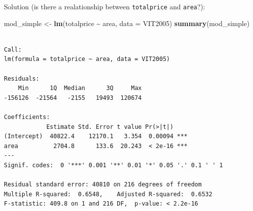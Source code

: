 \documentclass[
  ignorenonframetext,
]{beamer}
\newenvironment{Shaded}{\begin{snugshade}}{\end{snugshade}}
\newcommand{\AttributeTok}[1]{\textcolor[rgb]{0.13,0.29,0.53}{#1}}
\newcommand{\FunctionTok}[1]{\textcolor[rgb]{0.13,0.29,0.53}{\textbf{#1}}}
\newcommand{\NormalTok}[1]{#1}
\newcommand{\OtherTok}[1]{\textcolor[rgb]{0.56,0.35,0.01}{#1}}
\newcommand{\SpecialCharTok}[1]{\textcolor[rgb]{0.81,0.36,0.00}{\textbf{#1}}}
\begin{document}
\begin{frame}[fragile]{Solution (is there a realationship between
\texttt{totalprice} and \texttt{area}?):}
\protect\hypertarget{solution-is-there-a-realationship-between-totalprice-and-area-1}{}
\scriptsize

\begin{Shaded}
\begin{Highlighting}[]
\NormalTok{mod\_simple }\OtherTok{\textless{}{-}} \FunctionTok{lm}\NormalTok{(totalprice }\SpecialCharTok{\textasciitilde{}}\NormalTok{ area, }\AttributeTok{data =}\NormalTok{ VIT2005)}
\FunctionTok{summary}\NormalTok{(mod\_simple)}
\end{Highlighting}
\end{Shaded}

\begin{verbatim}

Call:
lm(formula = totalprice ~ area, data = VIT2005)

Residuals:
    Min      1Q  Median      3Q     Max 
-156126  -21564   -2155   19493  120674 

Coefficients:
            Estimate Std. Error t value Pr(>|t|)    
(Intercept)  40822.4    12170.1   3.354  0.00094 ***
area          2704.8      133.6  20.243  < 2e-16 ***
---
Signif. codes:  0 '***' 0.001 '**' 0.01 '*' 0.05 '.' 0.1 ' ' 1

Residual standard error: 40810 on 216 degrees of freedom
Multiple R-squared:  0.6548,    Adjusted R-squared:  0.6532 
F-statistic: 409.8 on 1 and 216 DF,  p-value: < 2.2e-16
\end{verbatim}

\normalsize
\end{frame}
\end{document}
